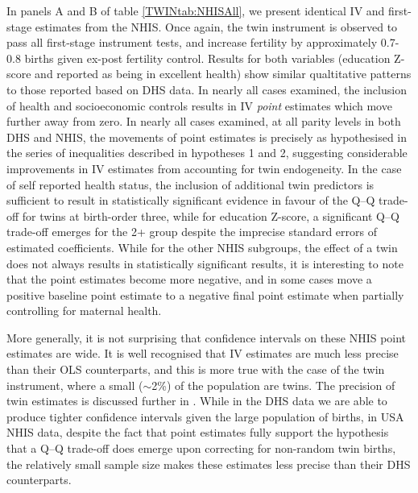 \documentclass[subeqn]{article}
\begin{document}
\begin{spacing}{1.4}
In panels A and B of table \ref{TWINtab:NHISAll}, we present identical IV and
first-stage estimates from the NHIS.  Once again, the twin instrument is
observed to pass all first-stage instrument tests, and increase fertility by
approximately 0.7-0.8 births given ex-post fertility control.  Results for both
variables (education Z-score and reported as being in excellent health) show
similar qualtitative patterns to those reported based on DHS data.  In nearly
all cases examined, the inclusion of health and socioeconomic controls results
in IV \emph{point} estimates which move further away from zero. In nearly all
cases examined, at all parity levels in both DHS and NHIS, the movements of
point estimates is precisely as hypothesised in the series of inequalities
described in hypotheses 1 and 2, suggesting considerable improvements in IV
estimates from accounting for twin endogeneity.  In the case of self reported
health status, the inclusion of additional twin predictors is sufficient to
result in statistically significant evidence in favour of the Q--Q trade-off for
twins at birth-order three, while for education Z-score, a significant Q--Q
trade-off emerges for the 2+ group despite the imprecise standard errors of
estimated coefficients. While for the other NHIS subgroups, the effect of a
twin does not always results in statistically significant results, it is
interesting to note that the point estimates become more negative, and in
some cases move a positive baseline point estimate to a negative final point
estimate when partially controlling for maternal health.

More generally, it is not surprising that confidence intervals on these NHIS
point estimates are wide.  It is well recognised that IV estimates are much
less precise than their OLS counterparts, and this is more true with the case
of the twin instrument, where a small ($\sim$2\%) of the population are twins.
The precision of twin estimates is discussed further in \citet{Angristetal2010}.
While in the DHS data we are able to produce tighter confidence intervals given
the large population of births, in USA NHIS data, despite the fact that point 
estimates fully support the hypothesis that a Q--Q trade-off does emerge upon 
correcting for non-random twin births, the relatively small sample size makes 
these estimates less precise than their DHS counterparts.


\end{spacing}
\end{document}
